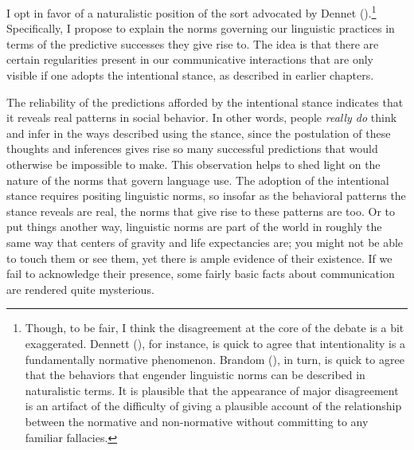 I opt in favor of a naturalistic position of the sort advocated by Dennet (\citeyear{Dennett:2010,Dennett:1991,Dennett:1987}).\footnote{Though, to be fair, I think the disagreement at the core of the debate is a bit exaggerated. Dennett (\citeyear{Dennett:2010,Dennett:1987}), for instance, is quick to agree that intentionality is a fundamentally normative phenomenon. Brandom (\citeyear{Brandom:1994,Brandom:2010}), in turn, is quick to agree that the behaviors that engender linguistic norms can be described in naturalistic terms. It is plausible that the appearance of major disagreement is an artifact of the difficulty of giving a plausible account of the relationship between the normative and non-normative without committing to any familiar fallacies.} Specifically, I propose to explain the norms governing our linguistic practices in terms of the predictive successes they give rise to. The idea is that there are certain regularities present in our communicative interactions that are only visible if one adopts the intentional stance, as described in earlier chapters. 

The reliability of the predictions afforded by the intentional stance indicates that it reveals real patterns in social behavior. In other words, people \textit{really do} think and infer in the ways described using the stance, since the postulation of these thoughts and inferences gives rise so many successful predictions that would otherwise be impossible to make. This observation helps to shed light on the nature of the norms that govern language use. The adoption of the intentional stance requires positing linguistic norms, so insofar as the behavioral patterns the stance reveals are real, the norms that give rise to these patterns are too. Or to put things another way, linguistic norms are part of the world in roughly the same way that centers of gravity and life expectancies are; you might not be able to touch them or see them, yet there is ample evidence of their existence. If we fail to acknowledge their presence, some fairly basic facts about communication are rendered quite mysterious.

